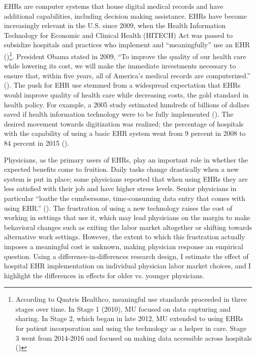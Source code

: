 \documentclass[12pt]{article}
\begin{document}
EHRs are computer systems that house digital medical records and have additional capabilities, including decision making assistance. EHRs have become increasingly relevant in the U.S. since 2009, when the Health Information Technology for Economic and Clinical Health (HITECH) Act was passed to subsidize hospitals and practices who implement and ``meaningfully'' use an EHR (\cite{hitech})\footnote{According to Quatris Healthco, meaningful use standards proceeded in three stages over time. In Stage 1 (2010), MU focused on data capturing and sharing. In Stage 2, which began in late 2012, MU extended to using EHRs for patient incorporation and using the technology as a helper in care. Stage 3 went from 2014-2016 and focused on making data accessible across hospitals (\cite{meanuse})}. President Obama stated in 2009, “To improve the quality of our health care while lowering its cost, we will make the immediate investments necessary to ensure that, within five years, all of America’s medical records are computerized.” (\cite{presquote}). The push for EHR use stemmed from a widespread expectation that EHRs would improve quality of health care while decreasing costs, the gold standard in health policy. For example, a 2005 study estimated hundreds of billions of dollars saved if health information technology were to be fully implemented (\cite{hillestad2005}). The desired movement towards digitization was realized; the percentage of hospitals with the capability of using a basic EHR system went from 9 percent in 2008 to 84 percent in 2015 (\cite{stats}).

Physicians, as the primary users of EHRs, play an important role in whether the expected benefits come to fruition. Daily tasks change drastically when a new system is put in place; some physicians reported that when using EHRs they are less satisfied with their job and have higher stress levels. Senior physicians in particular “loathe the cumbersome, time-consuming data entry that comes with using EHR.” (\cite{CollierBurnout}). The frustration of using a new technology raises the cost of working in settings that use it, which may lead physicians on the margin to make behavioral changes such as exiting the labor market altogether or shifting towards alternative work settings. However, the extent to which this frustration actually imposes a meaningful cost is unknown, making physician response an empirical question. Using a difference-in-differences research design, I estimate the effect of hospital EHR implementation on individual physician labor market choices, and I highlight the differences in effects for older vs. younger physicians.
\end{document}

